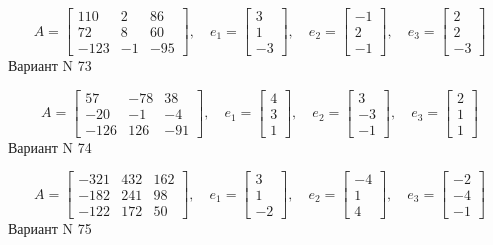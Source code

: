 \documentclass[11pt]{report}
\begin{document}
$$A = \left[\begin{matrix}110 & 2 & 86\\72 & 8 & 60\\-123 & -1 & -95\end{matrix}\right],\quad e_1 = \left[\begin{matrix}3\\1\\-3\end{matrix}\right],\quad e_2 = \left[\begin{matrix}-1\\2\\-1\end{matrix}\right],\quad e_3 = \left[\begin{matrix}2\\2\\-3\end{matrix}\right]$$Вариант N 73

$$A = \left[\begin{matrix}57 & -78 & 38\\-20 & -1 & -4\\-126 & 126 & -91\end{matrix}\right],\quad e_1 = \left[\begin{matrix}4\\3\\1\end{matrix}\right],\quad e_2 = \left[\begin{matrix}3\\-3\\-1\end{matrix}\right],\quad e_3 = \left[\begin{matrix}2\\1\\1\end{matrix}\right]$$Вариант N 74

$$A = \left[\begin{matrix}-321 & 432 & 162\\-182 & 241 & 98\\-122 & 172 & 50\end{matrix}\right],\quad e_1 = \left[\begin{matrix}3\\1\\-2\end{matrix}\right],\quad e_2 = \left[\begin{matrix}-4\\1\\4\end{matrix}\right],\quad e_3 = \left[\begin{matrix}-2\\-4\\-1\end{matrix}\right]$$Вариант N 75
\end{document}
